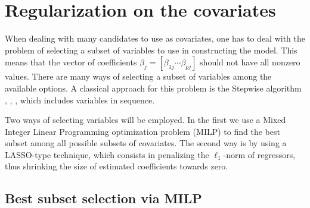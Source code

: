 \section{Regularization on the covariates} \label{sec:regularization}

When dealing with many candidates to use as covariates, one has to deal with the problem of selecting a subset of variables to use in constructing the model. 
This means that the vector of coefficients $\beta_j = [ \beta_{1 j} \cdots \beta_{pj} ]$ should not have all nonzero values.
There are many ways of selecting a subset of variables among the available options.
A classical approach for this problem is the Stepwise algorithm \cite{efroymson1960multiple}, \cite{hocking_selection_1967}, \cite{tibshirani1996regression}, which includes variables in sequence. 

Two ways of selecting variables will be employed. In the first we use a Mixed Integer Linear Programming optimization problem (MILP) to find the best subset among all possible subsets of covariates. The second way is by using a LASSO-type technique, which consists in penalizing the $\ell_1$-norm of regressors, thus shrinking the size of estimated coefficients towards zero.  

\subsection{Best subset selection via MILP}
\label{sec:best-subset-mip}

